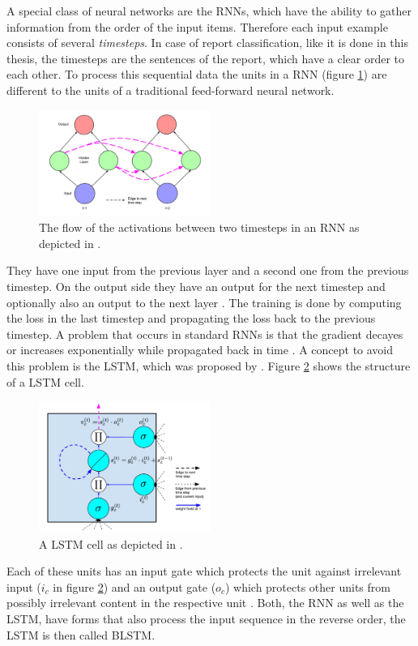 A special class of neural networks are the \acp{RNN}, which have the ability to gather information from the order of the input items.
Therefore each input example consists of several \textit{timesteps}.
In case of report classification, like it is done in this thesis, the timesteps are the sentences of the report, which have a clear order to each other.
To process this sequential data the units in a \acs{RNN} (figure \ref{figure:rnn_unfolded}) are different to the units of a traditional feed-forward neural network.
\begin{figure}[h]
    \centering
    \includegraphics[width=0.5\textwidth]{figures/rnn_unfolded.png}
    \caption{The flow of the activations between two timesteps in an RNN as depicted in \cite[p. 12]{Lipton2015}.}
    \label{figure:rnn_unfolded}
\end{figure}
They have one input from the previous layer and a second one from the previous timestep.
On the output side they have an output for the next timestep and optionally also an output to the next layer \cite[p. 373]{Goodfellow2016}.
The training is done by computing the loss in the last timestep and propagating the loss back to the previous timestep.
A problem that occurs in standard \acp{RNN} is that the gradient decayes or increases exponentially while propagated back in time \cite[p. 13]{Lipton2015}.
A concept to avoid this problem is the \acs{LSTM}, which was proposed by \cite{Hochreiter1997}.
Figure \ref{figure:lstm_cell} shows the structure of a LSTM cell.
\begin{figure}[h]
    \centering
    \includegraphics[width=0.5\textwidth]{figures/lstm_cell.png}
    \caption{A LSTM cell as depicted in \cite[p. 17]{Lipton2015}.}
    \label{figure:lstm_cell}
\end{figure}
Each of these units has an input gate which protects the unit against irrelevant input ($i_c$ in figure \ref{figure:lstm_cell}) and an output gate ($o_c$) which protects other units from possibly irrelevant content in the respective unit \cite[p. 6]{Hochreiter1997}.
Both, the \ac{RNN} as well as the \ac{LSTM}, have forms that also process the input sequence in the reverse order, the \ac{LSTM} is then called \ac{BLSTM}.

